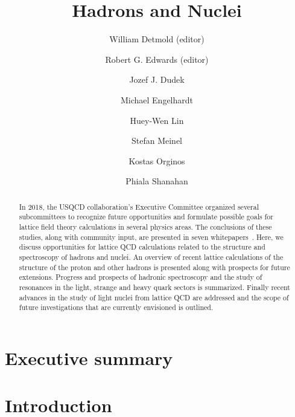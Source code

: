 \documentclass[hyperpdf,aps,prd,superscriptaddress,nofootinbib,preprint,preprintnumbers,floatfix,tightenlines]{revtex4-1}
\begin{document}
\title{Hadrons and Nuclei}
%
\author{William Detmold (editor)}
%
\author{Robert G. Edwards (editor)}
%
\author{Jozef J. Dudek}
%
\author{Michael Engelhardt}
%
\author{Huey-Wen Lin}
%
\author{Stefan Meinel}
%
\author{Kostas Orginos}
%
\author{Phiala Shanahan}

\begin{abstract}
  In 2018, the USQCD collaboration’s Executive Committee organized several subcommittees to recognize future opportunities and formulate possible goals for lattice field theory calculations in several physics areas.  The conclusions of these studies, along with community input, are presented in seven whitepapers~\cite{Bazavov:2018qcd,Brower:2018qcd,Davoudi:2018qcd,Detmold:2018qcd,Joo:2018qcd,Kronfeld:2018qcd,Lehner:2018qcd}.
Here, we discuss opportunities for lattice QCD calculations related to the structure and spectroscopy of hadrons and nuclei. An overview of recent lattice calculations of the structure of the proton and other hadrons is presented along with prospects for future extensions. Progress and prospects of hadronic spectroscopy and the study of resonances in the light, strange and heavy quark sectors is summarized. Finally recent advances in the study of light nuclei from lattice QCD are addressed and the scope of future investigations that are currently envisioned is outlined.
\end{abstract}


\maketitle

\tableofcontents
\newpage 

\section*{Executive summary}


\section{Introduction}
\label{sec:intro}

\end{document}

